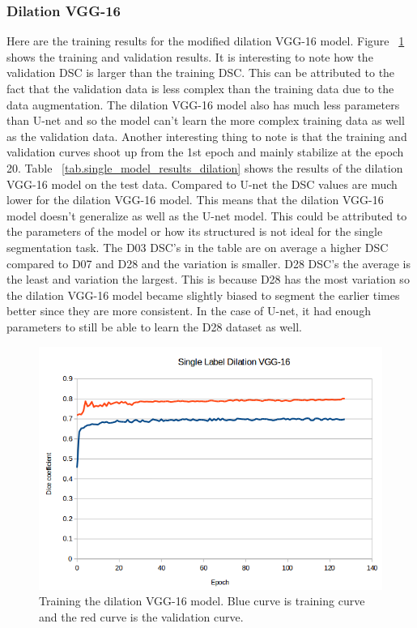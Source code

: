 \subsubsection{Dilation VGG-16}
    Here are the training results for the modified dilation VGG-16 model. 
    Figure ~\ref{fig:results_single_dilation_train} shows the training and validation results. 
    It is interesting to note how the validation DSC is larger than the training DSC.
    This can be attributed to the fact that the validation data is less complex than the training data due to the data augmentation. 
    The dilation VGG-16 model also has much less parameters than U-net and so the model can't learn the more complex training data as well as the validation data. 
    Another interesting thing to note is that the training and validation curves shoot up from the 1st epoch and mainly stabilize at the epoch 20. 
    Table ~\ref{tab.single_model_results_dilation} shows the results of the dilation VGG-16 model on the test data. Compared to U-net the DSC values are much lower for the dilation VGG-16 model. 
    This means that the dilation VGG-16 model doesn't generalize as well as the U-net model. 
    This could be attributed to the parameters of the model or how its structured is not ideal for the single segmentation task. 
    The D03 DSC's in the table are on average a higher DSC compared to D07 and D28 and the variation is smaller. 
    D28 DSC's the average is the least and variation the largest.
    This is because D28 has the most variation so the dilation VGG-16 model became slightly biased to segment the earlier times better since they are more consistent.
    In the case of U-net, it had enough parameters to still be able to learn the D28 dataset as well. 

\begin{figure}[!tbh]
\centering
\includegraphics[width=\textwidth]{results/train_results_single_dilation.png}
\caption{Training the dilation VGG-16 model. Blue curve is training curve and the red curve is the validation curve. }
\label{fig:results_single_dilation_train}
\end{figure}


